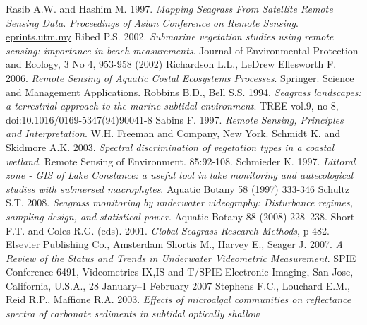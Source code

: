 \documentclass[11pt]{article}
\begin{document}
\begin{thebibliography}{999}
Rasib A.W. and Hashim M. 1997. \emph{Mapping Seagrass From Satellite Remote Sensing
Data. Proceedings of Asian Conference on Remote Sensing}. \href{http://eprints.utm.my/2161/}{eprints.utm.my} \pageref{Rasib97}
Ribed P.S. 2002. \emph{Submarine vegetation studies using remote sensing: importance in beach measurements}. Journal of Environmental Protection and Ecology, 3 No 4, 953-958 (2002) \pageref{Ribed02}
Richardson L.L., LeDrew Ellesworth F. 2006. \emph{Remote Sensing of Aquatic Costal
Ecosystems Processes}. Springer. Science and Management Applications. \pageref{Richardson06}
Robbins B.D., Bell S.S. 1994. \emph{Seagrass landscapes: a terrestrial approach to the marine
subtidal environment}. TREE vol.9, no 8, doi:10.1016/0169-5347(94)90041-8 \pageref{Robbins94}
Sabins F. 1997. \emph{Remote Sensing, Principles and Interpretation}. W.H. Freeman and
Company, New York. \pageref{Sabins97}
Schmidt K. and Skidmore A.K. 2003. \emph{Spectral discrimination of vegetation types in a
coastal wetland}. Remote Sensing of Environment. 85:92-108. \pageref{Schmidt03}
Schmieder K. 1997. \emph{Littoral zone - GIS of Lake Constance: a useful tool in lake
monitoring and autecological studies with submersed macrophytes}. Aquatic Botany 58
(1997) 333-346 \pageref{Schmieder97}
Schultz S.T. 2008. \emph{Seagrass monitoring by underwater videography: Disturbance
regimes, sampling design, and statistical power}. Aquatic Botany 88 (2008) 228–238. \pageref{Schultz08}
Short F.T. and Coles R.G. (eds). 2001. \emph{Global Seagrass Research Methods}, p 482.
Elsevier Publishing Co., Amsterdam \pageref{Short01}
Shortis M., Harvey E., Seager J. 2007. \emph{A Review of the Status and Trends in Underwater Videometric Measurement}. SPIE Conference 6491, Videometrics IX,IS and T/SPIE Electronic Imaging, San Jose, California, U.S.A., 28 January–1 February 2007 \pageref{Shortis07}
Stephens F.C., Louchard E.M., Reid R.P., Maffione R.A. 2003. \emph{Effects of microalgal communities on reflectance spectra of carbonate sediments in subtidal optically shallow
}
\end{thebibliography}
\end{document}
